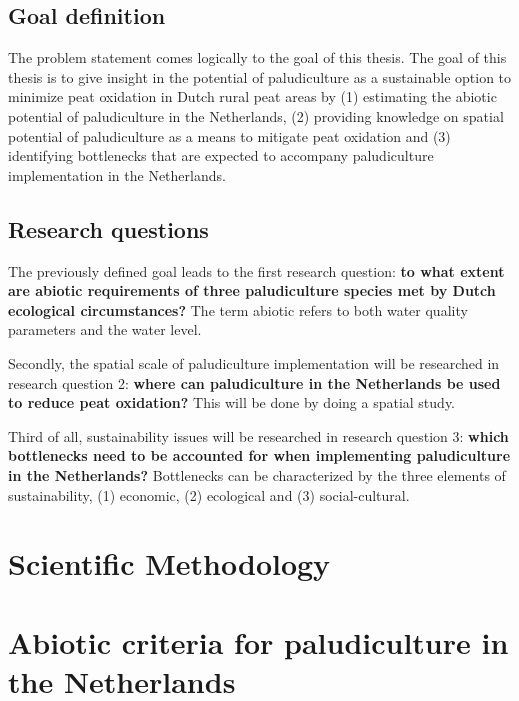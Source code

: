 \documentclass[12pt,a4paper,titlepage]{article}
\begin{document}
\subsection{Goal definition}
The problem statement comes logically to the goal of this thesis. The goal of this thesis is to give insight in the potential of paludiculture as a sustainable option to minimize peat oxidation in Dutch rural peat areas by (1) estimating the abiotic potential of paludiculture in the Netherlands, (2) providing knowledge on spatial potential of paludiculture as a means to mitigate peat oxidation and (3) identifying bottlenecks that are expected to accompany paludiculture implementation in the Netherlands. 


\subsection{Research questions}
The previously defined goal leads to the first research question: \textbf{to what extent are abiotic requirements of three paludiculture species met by Dutch ecological circumstances?} The term abiotic refers to both water quality parameters and the water level.

Secondly, the spatial scale of paludiculture implementation will be researched in research question 2: \textbf{where can paludiculture in the Netherlands be used to reduce peat oxidation? } This will be done by doing a spatial study. 

Third of all, sustainability issues will be researched in research question 3: \textbf{which bottlenecks need to be accounted for when implementing paludiculture in the Netherlands?} Bottlenecks can be characterized by the three elements of sustainability, (1) economic, (2) ecological and (3) social-cultural. 

\section{Scientific Methodology}

\section{Abiotic criteria for paludiculture in the Netherlands}
\end{document}
